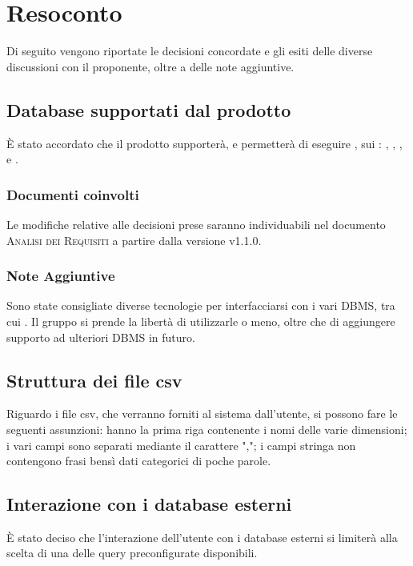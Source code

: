 \documentclass{article}
\begin{document}
\section{Resoconto}
\label{sec:resoconto}

Di seguito vengono riportate le decisioni concordate e gli esiti delle diverse discussioni con il proponente, oltre a 
delle note aggiuntive.

\subsection{Database supportati dal prodotto}
\label{itm:1}

\`{E} stato accordato che il prodotto supporter\`{a}, e permetter\`{a} di eseguire , sui : 
, ,  ,  e .

\subsubsection*{Documenti coinvolti}
Le modifiche relative alle decisioni prese saranno individuabili nel documento \textsc{Analisi dei Requisiti} a partire 
dalla versione v1.1.0.

\subsubsection*{Note Aggiuntive}
Sono state consigliate diverse tecnologie per interfacciarsi con i vari DBMS, tra cui . Il gruppo
si prende la libert\`{a} di utilizzarle o meno, oltre che di aggiungere supporto ad ulteriori DBMS in futuro.

\subsection{Struttura dei file csv}
\label{itm:2}

Riguardo i file csv, che verranno forniti al sistema dall'utente, si possono fare le seguenti assunzioni: hanno la prima 
riga contenente i nomi delle varie dimensioni; i vari campi sono separati mediante il carattere ","; i campi stringa non 
contengono frasi bens\`{i} dati categorici di poche parole.

\subsection{Interazione con i database esterni}
\label{itm:3}
\`{E} stato deciso che l'interazione dell'utente con i database esterni si limiter\`{a} alla scelta di una delle query 
preconfigurate disponibili.
\end{document}
